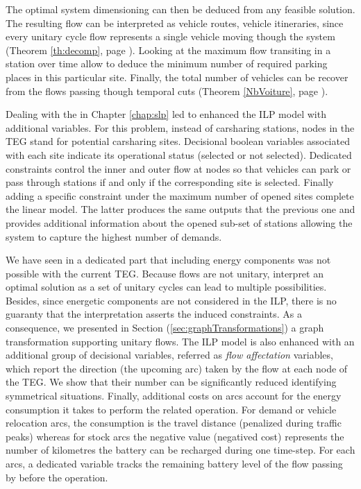 The optimal system dimensioning can then be deduced from any feasible solution.
The resulting flow can be interpreted as vehicle routes, \ie vehicle itineraries, since every unitary cycle flow represents a single vehicle moving though the system (\see Theorem \ref{th:decomp}, page \pageref{th:decomp}).
Looking at the maximum flow transiting in a station over time allow to deduce the minimum number of required parking places in this particular site.
Finally, the total number of vehicles can be recover from the flows passing though temporal cuts (\see Theorem \ref{NbVoiture}, page \pageref{NbVoiture}).

\medskip
Dealing with the {\SLP} in Chapter \ref{chap:slp} led to enhanced the ILP model with additional variables.
For this problem, instead of carsharing stations, nodes in the TEG stand for potential carsharing sites.
Decisional boolean variables associated with each site indicate its operational status (selected or not selected).
Dedicated constraints control the inner and outer flow at nodes so that vehicles can park or pass through stations if and only if the corresponding site is selected.
Finally adding a specific constraint under the maximum number of opened sites complete the linear model. 
The latter produces the same outputs that the previous one and  provides additional information about the opened sub-set of stations allowing the system to capture the highest number of demands.

\medskip
We have seen in a dedicated part that including energy components was not possible with the current TEG.
Because flows are not unitary, interpret an optimal solution as a set of unitary cycles can lead to multiple possibilities.
Besides, since energetic components are not considered in the ILP, there is no guaranty that the interpretation asserts the induced constraints.
As a consequence, we presented in Section (\ref{sec:graphTransformations}) a graph transformation supporting unitary flows.
The ILP model is also enhanced with an additional group of decisional variables, referred as \emph{flow affectation} variables, which report the direction (\ie the upcoming arc) taken by the flow at each node of the TEG.
We show that their number can be significantly reduced identifying symmetrical situations.
Finally, additional costs on arcs account for the energy consumption it takes to perform the related operation.
For demand or vehicle relocation arcs, the consumption is the travel distance (penalized during traffic peaks) whereas for stock arcs the negative value (negatived cost) represents the number of kilometres the battery can be recharged during one time-step.
For each arcs, a dedicated variable tracks the remaining battery level of the flow passing by before the operation.

